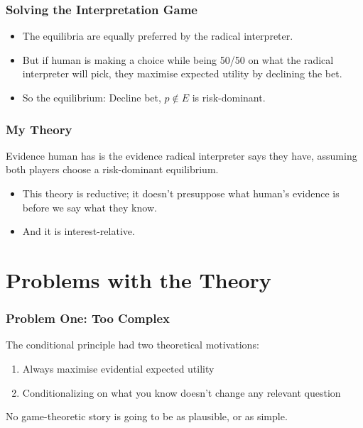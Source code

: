 \begin{frame}

\frametitle{Solving the Interpretation Game}
\label{solvingtheinterpretationgame}

\begin{itemize}
\item The equilibria are equally preferred by the radical interpreter.

\item But if human is making a choice while being 50\slash 50 on what the radical interpreter will pick, they maximise expected utility by declining the bet.

\item So the equilibrium: Decline bet, $p \notin E$ is risk-dominant.

\end{itemize}

\end{frame}

\begin{frame}

\frametitle{My Theory}
\label{mytheory}

Evidence human has is the evidence radical interpreter says they have, assuming both players choose a risk-dominant equilibrium.

\begin{itemize}
\item This theory is reductive; it doesn't presuppose what human's evidence is before we say what they know.

\item And it is interest-relative.

\end{itemize}

\end{frame}

\section{Problems with the Theory}
\label{problemswiththetheory}

\begin{frame}

\frametitle{Problem One: Too Complex}
\label{problemone:toocomplex}

The conditional principle had two theoretical motivations:

\begin{enumerate}
\item Always maximise evidential expected utility

\item Conditionalizing on what you know doesn't change any relevant question

\end{enumerate}

No game-theoretic story is going to be as plausible, or as simple.

\end{frame}

